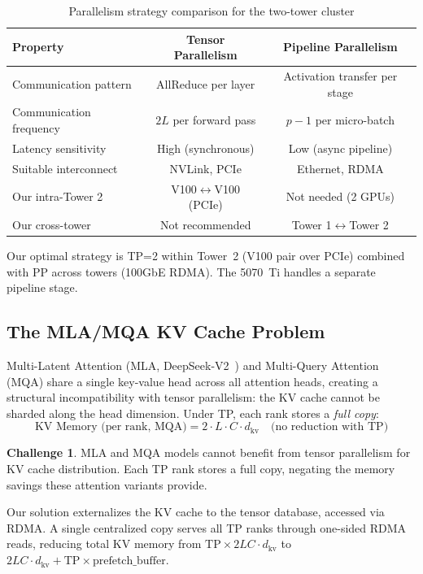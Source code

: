 \documentclass[11pt,letterpaper]{article}
\theoremstyle{definition}
\newtheorem{challenge}{Challenge}
\begin{document}
\begin{table}[htbp]
\centering
\caption{Parallelism strategy comparison for the two-tower cluster}
\label{tab:parallelism-comparison}
\begin{tabular}{@{}lcc@{}}
\toprule
\textbf{Property} & \textbf{Tensor Parallelism} & \textbf{Pipeline Parallelism} \\
\midrule
Communication pattern & AllReduce per layer & Activation transfer per stage \\
Communication frequency & $2L$ per forward pass & $p-1$ per micro-batch \\
Latency sensitivity & High (synchronous) & Low (async pipeline) \\
Suitable interconnect & NVLink, PCIe & Ethernet, RDMA \\
Our intra-Tower 2 & V100$\leftrightarrow$V100 (PCIe) & Not needed (2 GPUs) \\
Our cross-tower & Not recommended & Tower 1$\leftrightarrow$Tower 2 \\
\bottomrule
\end{tabular}
\end{table}

Our optimal strategy is TP=2 within Tower~2 (V100 pair over PCIe) combined with PP across towers (100GbE RDMA). The 5070~Ti handles a separate pipeline stage.

\subsection{The MLA/MQA KV Cache Problem}
\label{sec:mla-problem}

Multi-Latent Attention (MLA, DeepSeek-V2~\cite{deepseekv2}) and Multi-Query Attention (MQA) share a single key-value head across all attention heads, creating a structural incompatibility with tensor parallelism: the KV cache cannot be sharded along the head dimension. Under TP, each rank stores a \emph{full copy}:
\begin{equation}
    \text{KV Memory (per rank, MQA)} = 2 \cdot L \cdot C \cdot d_{\text{kv}} \quad \text{(no reduction with TP)}
\end{equation}

\begin{challenge}
MLA and MQA models cannot benefit from tensor parallelism for KV cache distribution. Each TP rank stores a full copy, negating the memory savings these attention variants provide.
\end{challenge}

Our solution externalizes the KV cache to the tensor database, accessed via RDMA. A single centralized copy serves all TP ranks through one-sided RDMA reads, reducing total KV memory from $\text{TP} \times 2LC \cdot d_{\text{kv}}$ to $2LC \cdot d_{\text{kv}} + \text{TP} \times \text{prefetch\_buffer}$.
\end{document}
